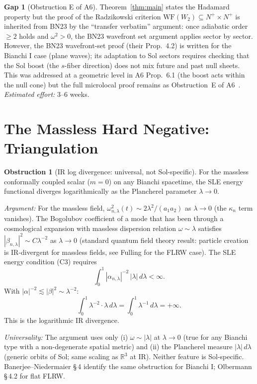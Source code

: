 \documentclass[11pt,a4paper]{article}
\theoremstyle{definition}
\newtheorem{obstruction}[theorem]{Obstruction}
\newtheorem{gap}[theorem]{Gap}
\newcommand{\R}{\mathbb{R}}
\newcommand{\WF}{\mathrm{WF}}
\begin{document}
\begin{gap}[Obstruction E of A6]\label{gap:WF}
Theorem~\ref{thm:main} states the Hadamard property but the proof of the
Radzikowski criterion $\WF(W_2) \subseteq N^+ \times N^+$ is inherited from BN23
\cite{BN23} by the ``transfer verbatim'' argument: once adiabatic order~$\geq 2$
holds and $\omega^2 > 0$, the BN23 wavefront set argument applies sector by sector.
However, the BN23 wavefront-set proof (their Prop.~4.2) is written for the
Bianchi I case (plane waves); its adaptation to Sol sectors requires checking that
the Sol boost (the $s$-fiber direction) does not mix future and past null sheets.
This was addressed at a geometric level in A6 Prop.~6.1 (the boost acts within
the null cone) but the full microlocal proof remains as Obstruction~E of A6~\cite{A6draft}.
\emph{Estimated effort:} 3--6 weeks.
\end{gap}

\section{The Massless Hard Negative: Triangulation}
\label{sec:massless}

\begin{obstruction}[IR log divergence: universal, not Sol-specific]\label{obs:massless}
For the massless conformally coupled scalar ($m = 0$) on any Bianchi spacetime,
the SLE energy functional diverges logarithmically as the Plancherel parameter
$\lambda \to 0$.

\emph{Argument:}
For the massless field, $\omega_{n,\lambda}^2(t) \sim 2\lambda^2/(a_1 a_2)$
as $\lambda \to 0$ (the $\kappa_n$ term vanishes).
The Bogolubov coefficient of a mode that has been through a cosmological expansion
with massless dispersion relation $\omega \sim \lambda$ satisfies
$|\beta_{n,\lambda}|^2 \sim C\lambda^{-2}$ as $\lambda \to 0$
(standard quantum field theory result: particle creation is IR-divergent for massless fields,
see Fulling \cite{Ful89} for the FLRW case).
The SLE energy condition (C3) requires
\[
  \int_0^1 |\alpha_{n,\lambda}|^{-2}\,|\lambda|\,d\lambda < \infty.
\]
With $|\alpha|^{-2} \lesssim |\beta|^2 \sim \lambda^{-2}$:
\[
  \int_0^1 \lambda^{-2}\cdot\lambda\,d\lambda = \int_0^1 \lambda^{-1}\,d\lambda = +\infty.
\]
This is the logarithmic IR divergence.

\emph{Universality:}
The argument uses only (i) $\omega \sim |\lambda|$ at $\lambda \to 0$ (true for any
Bianchi type with a non-degenerate spatial metric) and (ii) the Plancherel measure
$|\lambda|\,d\lambda$ (generic orbits of Sol; same scaling as $\R^3$ at IR).
Neither feature is Sol-specific.  Banerjee--Niedermaier \cite{BN23} §\,4 identify
the same obstruction for Bianchi I; Olbermann \cite{Olb07} §\,4.2 for flat FLRW.
\end{obstruction}
\end{document}
